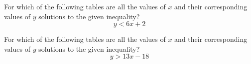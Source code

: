 \noindent\markforreview

\vspace{1em}

For which of the following tables are all the values of \( x \) and their corresponding values of \( y \) solutions to the given inequality?
\[
y < 6x + 2
\]

\vspace{0.75em}





\newpage
\noindent\markforreview

\vspace{1em}

For which of the following tables are all the values of \( x \) and their corresponding values of \( y \) solutions to the given inequality?
\[
y > 13x - 18
\]

\vspace{0.75em}


